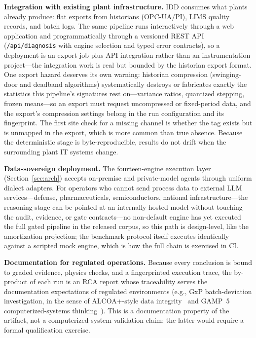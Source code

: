 \documentclass[preprint,12pt]{elsarticle}
\begin{document}
\textbf{Integration with existing plant infrastructure.} IDD consumes what plants already produce: flat exports from historians (OPC-UA/PI), LIMS quality records, and batch logs. The same pipeline runs interactively through a web application and programmatically through a versioned REST API (\texttt{/api/diagnosis} with engine selection and typed error contracts), so a deployment is an export job plus API integration rather than an instrumentation project---the integration work is real but bounded by the historian export format. One export hazard deserves its own warning: historian compression (swinging-door and deadband algorithms) systematically destroys or fabricates exactly the statistics this pipeline's signatures rest on---variance ratios, quantized stepping, frozen means---so an export must request uncompressed or fixed-period data, and the export's compression settings belong in the run configuration and its fingerprint. The first site check for a missing channel is whether the tag exists but is unmapped in the export, which is more common than true absence. Because the deterministic stage is byte-reproducible, results do not drift when the surrounding plant IT systems change.

\textbf{Data-sovereign deployment.} The fourteen-engine execution layer (Section~\ref{sec:arch}) accepts on-premise and private-model agents through uniform dialect adapters. For operators who cannot send process data to external LLM services---defense, pharmaceuticals, semiconductors, national infrastructure---the reasoning stage can be pointed at an internally hosted model without touching the audit, evidence, or gate contracts---no non-default engine has yet executed the full gated pipeline in the released corpus, so this path is design-level, like the amortization projection; the benchmark protocol itself executes identically against a scripted mock engine, which is how the full chain is exercised in CI.

\textbf{Documentation for regulated operations.} Because every conclusion is bound to graded evidence, physics checks, and a fingerprinted execution trace, the by-product of each run is an RCA report whose traceability serves the documentation expectations of regulated environments (e.g., GxP batch-deviation investigation, in the sense of ALCOA+-style data integrity~\cite{mhra2018} and GAMP~5 computerized-systems thinking~\cite{gamp2022}). This is a documentation property of the artifact, not a computerized-system validation claim; the latter would require a formal qualification exercise.
\end{document}
